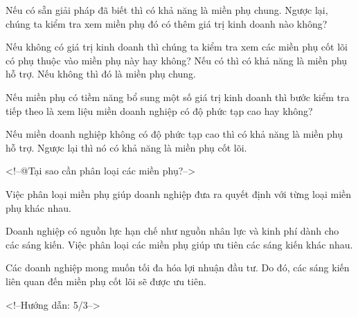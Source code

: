 Nếu có sẵn giải pháp đã biết thì có khả năng là miền phụ chung. Ngược lại, chúng ta kiểm tra xem miền phụ đó có thêm giá trị kinh doanh nào không? 

Nếu không có giá trị kinh doanh thì chúng ta kiểm tra xem các miền phụ cốt lõi có phụ thuộc vào miền phụ này hay không? Nếu có thì có khả năng là miền phụ hỗ trợ. Nếu không thì đó là miền phụ chung.

Nếu miền phụ có tiềm năng bổ sung một số giá trị kinh doanh thì bước kiểm tra tiếp theo là xem liệu miền doanh nghiệp có độ phức tạp cao hay không? 

Nếu miền doanh nghiệp không có độ phức tạp cao thì có khả năng là miền phụ hỗ trợ. Ngược lại thì nó có khả năng là miền phụ cốt lõi.

<!--@Tại sao cần phân loại các miền phụ?-->

Việc phân loại miền phụ giúp doanh nghiệp đưa ra quyết định với từng loại miền phụ khác nhau.

Doanh nghiệp có nguồn lực hạn chế như nguồn nhân lực và kinh phí dành cho các sáng kiến. Việc phân loại các miền phụ giúp ưu tiên các sáng kiến khác nhau.

Các doanh nghiệp mong muốn tối đa hóa lợi nhuận đầu tư. Do đó, các sáng kiến liên quan đến miền phụ cốt lõi sẽ được ưu tiên.

<!--Hướng dẫn: 5/3-->
% 